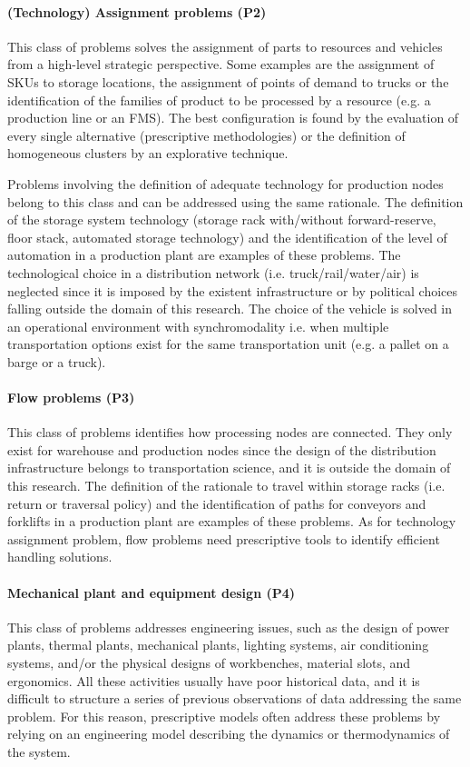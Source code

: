 \paragraph{(Technology) Assignment problems (P2)}
This class of problems solves the assignment of parts to resources and vehicles from a high-level strategic perspective. Some examples are the assignment of SKUs to storage locations, the assignment of points of demand to trucks or the identification of the families of product to be processed by a resource (e.g. a production line or an FMS). The best configuration is found by the evaluation of every single alternative (prescriptive methodologies) or the definition of homogeneous clusters by an explorative technique.\par

Problems involving the definition of adequate technology for production nodes belong to this class and can be addressed using the same rationale. The definition of the storage system technology (storage rack with/without forward-reserve, floor stack, automated storage technology) and the identification of the level of automation in a production plant are examples of these problems. The technological choice in a distribution network (i.e. truck/rail/water/air) is neglected since it is imposed by the existent infrastructure or by political choices falling outside the domain of this research. The choice of the vehicle is solved in an operational environment with synchromodality i.e. when multiple transportation options exist for the same transportation unit (e.g. a pallet on a barge or a truck).

\paragraph{Flow problems (P3)}
This class of problems identifies how processing nodes are connected. They only exist for warehouse and production nodes since the design of the distribution infrastructure belongs to transportation science, and it is outside the domain of this research. The definition of the rationale to travel within storage racks (i.e. return or traversal policy) and the identification of paths for conveyors and forklifts in a production plant are examples of these problems. As for technology assignment problem, flow problems need prescriptive tools to identify efficient handling solutions.

\paragraph{Mechanical plant and equipment design (P4)}
This class of problems addresses engineering issues, such as the design of power plants, thermal plants, mechanical plants, lighting systems, air conditioning systems, and/or the physical designs of workbenches, material slots, and ergonomics. All these activities usually have poor historical data, and it is difficult to structure a series of previous observations of data addressing the same problem. For this reason, prescriptive models often address these problems by relying on an engineering model describing the dynamics or thermodynamics of the system.

